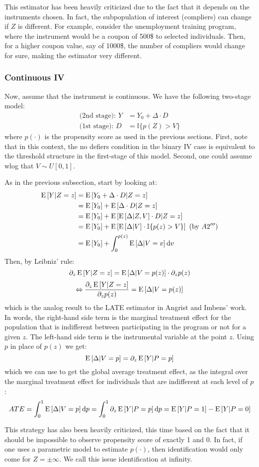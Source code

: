 This estimator has been heavily criticized due to the fact that it depends on the instruments chosen. In fact, the subpopulation of interest (compliers) can change if $Z$ is different. For example, consider the unemployment training program, where the instrument would be a coupon of 500\$ to selected individuals. Then, for a higher coupon value, say of 1000\$, the number of compliers would change for sure, making the estimator very different.

\subsubsection{Continuous IV}

Now, assume that the instrument is continuous. We have the following two-stage model:\begin{align*}
\text{(2nd stage): } Y & = Y_0 + \Delta\cdot D \\
\text{(1st stage): } D & = \mathbb{I}\{p(Z) > V\}
\end{align*} where $p(\cdot)$ is the propensity score as used in the previous sections. First, note that in this context, the no defiers condition in the binary IV case is equivalent to the threshold structure in the first-stage of this model. Second, one could assume wlog that $V\sim U[0,1]$.

As in the previous subsection, start by looking at: \begin{align*}
\operatorname{E}\left[Y\vert Z=z\right] & = \operatorname{E}\left[Y_0 + \Delta\cdot D \vert Z = z\right] \\
& = \operatorname{E}\left[Y_0\right] + \operatorname{E}\left[\Delta\cdot D \vert Z = z\right] \\ 
& = \operatorname{E}\left[Y_0\right] + \operatorname{E}\left[\operatorname{E}\left[\Delta\vert Z, V\right] \cdot D \vert Z = z\right] \\
& = \operatorname{E}\left[Y_0\right] + \operatorname{E}\left[\operatorname{E}\left[\Delta\vert V\right] \cdot \mathbb{I}\{p(z)>V\}\right] \text{ (by } A2''') \\ 
& = \operatorname{E}\left[Y_0\right] + \int_0^{p(z)}\operatorname{E}\left[\Delta\vert V=v\right] \mathrm{d} v 
\end{align*} 
Then, by Leibniz' rule: $$\partial_z \operatorname{E}\left[Y\vert Z=z\right] = \operatorname{E}\left[\Delta\vert V=p(z)\right]\cdot \partial_zp(z) $$ $$\Leftrightarrow \frac{\partial_z \operatorname{E}\left[Y\vert Z=z\right]}{\partial_zp(z)} = \operatorname{E}\left[\Delta\vert V=p(z)\right] $$ which is the analog result to the LATE estimator in Angrist and Imbens' work. In words, the right-hand side term is the marginal treatment effect for the population that is indifferent between participating in the program or not for a given $z$. The left-hand side term is the instrumental variable at the point $z$. Using $p$ in place of $p(z)$ we get: $$ \operatorname{E}\left[\Delta\vert V=p\right] = \partial_z \operatorname{E}\left[Y\vert P=p\right]$$ which we can use to get the global average treatment effect, as the integral over the marginal treatment effect for individuals that are indifferent at each level of $p$: $$ATE = \int_0^1 \operatorname{E}\left[\Delta\vert V=p\right]\mathrm{d} p = \int_0^1 \partial_z \operatorname{E}\left[Y\vert P=p\right]\mathrm{d} p = \operatorname{E}\left[Y\vert P=1\right] - \operatorname{E}\left[Y\vert P=0\right] $$

This strategy has also been heavily criticized, this time based on the fact that it should be impossible to observe propensity score of exactly 1 and 0. In fact, if one uses a parametric model to estimate $p(\cdot)$, then identification would only come for $Z=\pm \infty$. We call this issue identification at infinity.